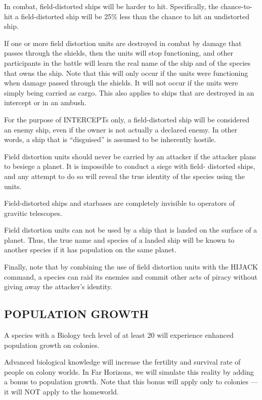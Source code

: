 \documentclass[10pt,titlepage]{article}
\begin{document}
In combat, field-distorted ships will be harder to hit.  Specifically, the
chance-to-hit a field-distorted ship will be 25\% less than the chance to hit
an undistorted ship.

If one or more field distortion units are destroyed in combat by damage that
passes through the shields, then the units will stop functioning, and other
participants in the battle will learn the real name of the ship and of the
species that owns the ship.  Note that this will only occur if the units were
functioning when damage passed through the shields.  It will not occur if the
units were simply being carried as cargo.  This also applies to ships that are
destroyed in an intercept or in an ambush.

For the purpose of INTERCEPTs only, a field-distorted ship will be considered
an enemy ship, even if the owner is not actually a declared enemy.  In other
words, a ship that is ``disguised'' is assumed to be inherently hostile.

Field distortion units should never be carried by an attacker if the attacker
plans to besiege a planet.  It is impossible to conduct a siege with field-
distorted ships, and any attempt to do so will reveal the true identity of the
species using the units.

Field-distorted ships and starbases are completely invisible to operators of
gravitic telescopes.

Field distortion units can not be used by a ship that is landed on the surface
of a planet.  Thus, the true name and species of a landed ship will be known
to another species if it has population on the same planet.

Finally, note that by combining the use of field distortion units with the
HIJACK command, a species can raid its enemies and commit other acts of piracy
without giving away the attacker's identity.


\subsection{POPULATION GROWTH}

A species with a Biology tech level of at least 20 will experience enhanced
population growth on colonies.

Advanced biological knowledge will increase the fertility and survival rate of
people on colony worlds.  In Far Horizons, we will simulate this reality by
adding a bonus to population growth.  Note that this bonus will apply only to
colonies --- it will NOT apply to the homeworld.
\end{document}
